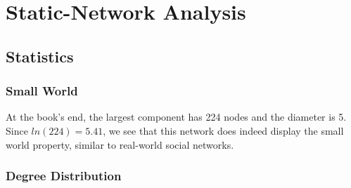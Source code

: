 \section{Static-Network Analysis}

\subsection{Statistics}

\subsubsection{Small World}
At the book's end, the largest component has 224 nodes and the diameter is 5.
Since $ln(224) = 5.41$, we see that this network does indeed display the small world property, similar to real-world social networks.

\subsubsection{Degree Distribution}

